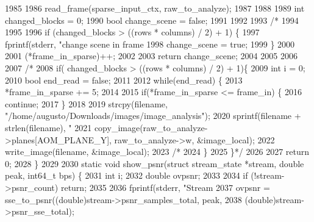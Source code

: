 \begin{DoxyCodeInclude}
{{{{{{{{{{{{{{{{{{{{{{{{{{{{{{{{{{{{{{{{{{{{{{{{1985 \textcolor{comment}{}
1986 \textcolor{comment}{  read\_frame(sparse\_input\_ctx, raw\_to\_analyze);}
1987 \textcolor{comment}{}
1988 \textcolor{comment}{}
1989 \textcolor{comment}{  int changed\_blocks = 0;}
1990 \textcolor{comment}{  bool change\_scene = false;}
1991 \textcolor{comment}{}
1992 \textcolor{comment}{}
1993 \textcolor{comment}{  /*}
1994 \textcolor{comment}{}
1995 \textcolor{comment}{}
1996 \textcolor{comment}{  if (changed\_blocks > ((rows * columns) / 2) + 1) \{}
1997 \textcolor{comment}{    fprintf(stderr, "change scene in frame %
1998 \textcolor{comment}{    change\_scene = true;}
1999 \textcolor{comment}{  \}}
2000 \textcolor{comment}{}
2001 \textcolor{comment}{  (*frame\_in\_sparse)++;}
2002 \textcolor{comment}{}
2003 \textcolor{comment}{  return change\_scene;}
2004 \textcolor{comment}{}
2005 \textcolor{comment}{}
2006 \textcolor{comment}{}
2007 \textcolor{comment}{  /*}
2008 \textcolor{comment}{  if( changed\_blocks > ((rows * columns) / 2) + 1)\{}
2009 \textcolor{comment}{    int i = 0;}
2010 \textcolor{comment}{     bool end\_read = false;}
2011 \textcolor{comment}{}
2012 \textcolor{comment}{     while(end\_read) \{}
2013 \textcolor{comment}{   *frame\_in\_sparse += 5;}
2014 \textcolor{comment}{}
2015 \textcolor{comment}{       if(*frame\_in\_sparse <= frame\_in) \{}
2016 \textcolor{comment}{         continue;}
2017 \textcolor{comment}{       \}}
2018 \textcolor{comment}{}
2019 \textcolor{comment}{       strcpy(filename, "/home/augusto/Downloads/images/image\_analysis");}
2020 \textcolor{comment}{       sprintf(filename + strlen(filename), "%
2021 \textcolor{comment}{       copy\_image(raw\_to\_analyze->planes[AOM\_PLANE\_Y], raw\_to\_analyze->w, &image\_local);}
2022 \textcolor{comment}{       write\_image(filename, &image\_local);}
2023 \textcolor{comment}{       /*}
2024 \textcolor{comment}{     \}}
2025 \textcolor{comment}{  \}*/}
2026 
2027   \textcolor{keywordflow}{return} 0;
2028 \}
2029 
2030 \textcolor{keyword}{static} \textcolor{keywordtype}{void} show\_psnr(\textcolor{keyword}{struct} stream\_state *stream, \textcolor{keywordtype}{double} peak, int64\_t bps) \{
2031   \textcolor{keywordtype}{int} i;
2032   \textcolor{keywordtype}{double} ovpsnr;
2033 
2034   \textcolor{keywordflow}{if} (!stream->psnr\_count) \textcolor{keywordflow}{return};
2035 
2036   fprintf(stderr, \textcolor{stringliteral}{"Stream %
2037   ovpsnr = sse\_to\_psnr((\textcolor{keywordtype}{double})stream->psnr\_samples\_total, peak,
2038       (\textcolor{keywordtype}{double})stream->psnr\_sse\_total);
}}}}}}}}}}}}}}}}}}}}}}}}}}}}}}}}}}}}}}}}}}}}}}}}}}}
\end{DoxyCodeInclude}

